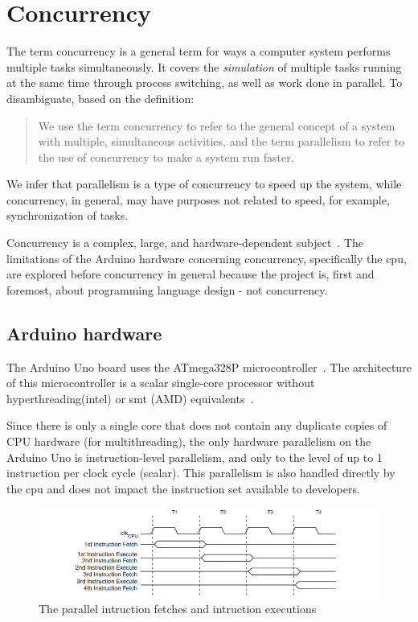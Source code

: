 \section{Concurrency}\label{sec:concurrency}
The term concurrency is a general term for ways a computer system performs multiple tasks simultaneously. It covers the \textit{simulation} of multiple tasks running at the same time through process switching, as well as work done in parallel. To disambiguate, based on the definition:

\blockcquote{Bryant2016}{We use the term concurrency to refer to the general concept of a system with multiple, simultaneous activities, and the term parallelism to refer to the use of concurrency to make a system run faster.}

We infer that parallelism is a type of concurrency to speed up the system, while concurrency, in general, may have purposes not related to speed, for example, synchronization of tasks.

Concurrency is a complex, large, and hardware-dependent subject~\cite{Sebesta2016}. The limitations of the Arduino hardware concerning concurrency, specifically the \gls{cpu}, are explored before concurrency in general because the project is, first and foremost, about programming language design - not concurrency.

\subsection{Arduino hardware}\label{subsec:arduinohardware}
The Arduino Uno board uses the ATmega328P microcontroller~\cite{ArduinoUno}. The architecture of this microcontroller is a scalar single-core processor without hyperthreading(intel) or \gls{smt} (AMD) equivalents~\cite{ATmega328P}.

Since there is only a single core that does not contain any duplicate copies of CPU hardware (for multithreading), the only hardware parallelism on the Arduino Uno is instruction-level parallelism, and only to the level of up to 1 instruction per clock cycle (scalar). This parallelism is also handled directly by the \gls{cpu} and does not impact the instruction set available to developers.


\begin{figure}[htb!]
    \centering
    \includegraphics[width=\textwidth]{figures/Arduino_Pipeline.png}
    \caption{The parallel intruction fetches and intruction executions \cite{ATmega328P}}
    \label{fig:arduinopipeline}
\end{figure}


